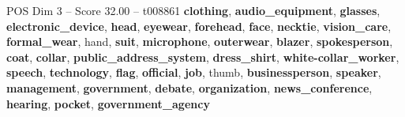 \begin{textsample}{POS Dim 3 – Score 32.00 – t008861}  \label{ex:f3_pos_011}
\textbf{clothing}, \textbf{audio\_equipment}, \textbf{glasses}, \textbf{electronic\_device}, \textbf{head}, \textbf{eyewear}, \textbf{forehead}, \textbf{face}, \textbf{necktie}, \textbf{vision\_care}, \textbf{formal\_wear}, hand, \textbf{suit}, \textbf{microphone}, \textbf{outerwear}, \textbf{blazer}, \textbf{spokesperson}, \textbf{coat}, \textbf{collar}, \textbf{public\_address\_system}, \textbf{dress\_shirt}, \textbf{white-collar\_worker}, \textbf{speech}, \textbf{technology}, \textbf{flag}, \textbf{official}, \textbf{job}, thumb, \textbf{businessperson}, \textbf{speaker}, \textbf{management}, \textbf{government}, \textbf{debate}, \textbf{organization}, \textbf{news\_conference}, \textbf{hearing}, \textbf{pocket}, \textbf{government\_agency}

\end{textsample}
